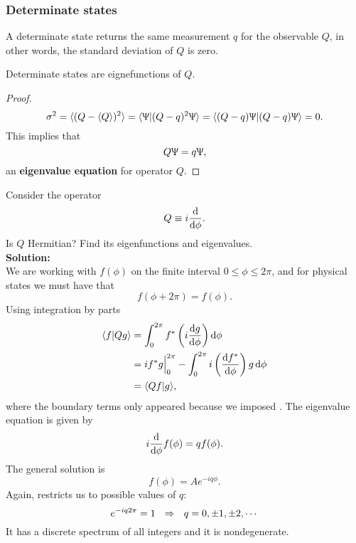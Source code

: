 \subsubsection{Determinate states}
\begin{defi}
A determinate state returns the same measurement $q$ for the observable $Q$, in other words, the standard deviation of $Q$ is zero. 
\end{defi}
\begin{lemma}
Determinate states are eignefunctions of $Q$. 
\end{lemma}
\begin{proof}
\begin{equation}
\sigma^2=\langle (Q- \langle Q\rangle)^2\rangle=\langle \Uppsi|(Q-q)^2\Uppsi\rangle=\langle (Q-q)\Uppsi|(Q-q)\Uppsi\rangle=0.
\end{equation}
This implies that 
\begin{equation}
Q\Uppsi=q\Uppsi, 
\end{equation}
an \textbf{eigenvalue equation} for operator $Q$.
\end{proof}
\begin{wex}
Consider the operator
\begin{equation}
Q\equiv i\diff{}{\phi}.
\end{equation}
Is $Q$ Hermitian? Find its eigenfunctions and eigenvalues.\\
\textbf{Solution: }\\
We are working with $f(\phi)$ on the finite interval $0\leq\phi\leq2\pi$, and for physical states we must have that
\begin{equation}
\label{phi_period}
f(\phi+2\pi)=f(\phi).
\end{equation}
Using integration by parts
\begin{subequations}
\begin{align}
\lgl f|Qg\rgl&=\int^{2\pi}_0f^*\lf(i\diff g\phi \rt)\dif\phi\\
&=if^*g\Big|^{2\pi}_0-\int^{2\pi}_0i\lf(\diff{f^*}{\phi} \rt)g\dif\phi\\
&=\lgl Qf|g\rgl, 
\end{align}
\end{subequations}
where the boundary terms only appeared because we imposed . 
The eigenvalue equation is given by
\begin{equation}
i\diff*{f(\phi)}\phi=qf(\phi).
\end{equation}
The general solution is 
\begin{equation}
f(\phi)=Ae^{-iq\phi}.	
\end{equation}
Again,  restricts us to possible values of $q$:
\begin{equation}
e^{-iq2\pi}=1\ \ \imp\ \ q=0,\pm1,\pm2,\cdots
\end{equation}
It has a discrete spectrum of all integers and it is nondegenerate.
\end{wex}
